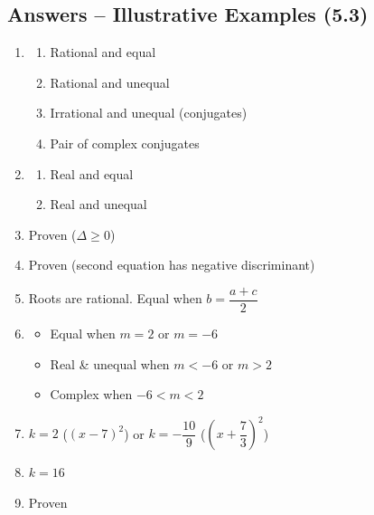 \documentclass[12pt,a4paper]{article}
\begin{document}
\subsection{Answers -- Illustrative Examples (5.3)}

\begin{enumerate}[label=Example \arabic*.]
    \item 
    \begin{enumerate}[label=(\roman*)]
        \item Rational and equal
        \item Rational and unequal
        \item Irrational and unequal (conjugates)
        \item Pair of complex conjugates
    \end{enumerate}

    \item 
    \begin{enumerate}[label=(\roman*)]
        \item Real and equal
        \item Real and unequal
    \end{enumerate}

    \item Proven (\(\Delta \geq 0\))

    \item Proven (second equation has negative discriminant)

    \item Roots are rational. Equal when \( b = \dfrac{a+c}{2} \)

    \item 
    \begin{itemize}
        \item Equal when \( m = 2 \) or \( m = -6 \)
        \item Real \& unequal when \( m < -6 \) or \( m > 2 \)
        \item Complex when \( -6 < m < 2 \)
    \end{itemize}

    \item \( k = 2 \) (\( (x-7)^2 \)) or \( k = -\dfrac{10}{9} \) (\( \left(x + \dfrac{7}{3}\right)^2 \))

    \item \( k = 16 \)

    \item Proven
\end{enumerate}

\end{document}
